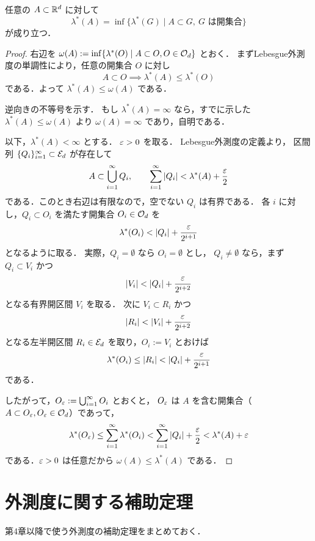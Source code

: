 \begin{theorem}[開集合による外正則性] \label{thm:lebesgue-outer-regularity-open}
任意の $A \subset \mathbb R^d$ に対して
\[
\lambda^*(A)
=
\inf\{\lambda^*(G)\mid A \subset G,\ G \text{ は開集合}\}
\]
が成り立つ．
\end{theorem}

\begin{proof}
    右辺を $\omega(A) := \inf\{ \lambda^*(O) \mid A \subset O, O \in \mathcal O_d \}$ とおく．
    まずLebesgue外測度の単調性により，任意の開集合 $O$ に対し \[A \subset O \implies \lambda^*(A) \le \lambda^*(O)\] である．よって $\lambda^*(A) \le \omega(A)$ である．

    逆向きの不等号を示す．
    もし $\lambda^*(A)=\infty$ なら，すでに示した $\lambda^*(A)\le\omega(A)$ より
    $\omega(A)=\infty$ であり，自明である．

    以下，$\lambda^*(A)<\infty$ とする．
    $\varepsilon>0$ を取る．
    Lebesgue外測度の定義より，
    区間列 $\{ Q_i \}_{i=1}^\infty \subset \mathcal E_d$ が存在して
    \[
    A \subset \bigcup_{i=1}^\infty Q_i,
    \qquad
    \sum_{i=1}^\infty |Q_i| < \lambda^*(A) + \frac{\varepsilon}{2}
    \]
    である．このとき右辺は有限なので，空でない $Q_i$ は有界である．
    各 $i$ に対し，$Q_i\subset O_i$ を満たす開集合 $O_i\in\mathcal O_d$ を
    \[
    \lambda^*(O_i) < |Q_i| + \frac{\varepsilon}{2^{i+1}}
    \]
    となるように取る．
    実際，$Q_i=\emptyset$ なら $O_i=\emptyset$ とし，
    $Q_i\neq\emptyset$ なら，まず $Q_i\subset V_i$ かつ
    \[
    |V_i|<|Q_i|+\frac{\eps}{2^{i+2}}
    \]
    となる有界開区間 $V_i$ を取る．
    次に $V_i\subset R_i$ かつ
    \[
    |R_i|<|V_i|+\frac{\eps}{2^{i+2}}
    \]
    となる左半開区間 $R_i\in\mathcal E_d$ を取り，$O_i:=V_i$ とおけば
    \[
    \lambda^*(O_i)\le |R_i|
    <
    |Q_i|+\frac{\varepsilon}{2^{i+1}}
    \]
    である．

    したがって，$O_\varepsilon := \bigcup_{i=1}^\infty O_i$ とおくと，
    $O_\varepsilon$ は $A$ を含む開集合（$A \subset O_\varepsilon, O_\varepsilon \in \mathcal O_d$）であって，
    \[
    \lambda^*(O_\varepsilon)
    \le
    \sum_{i=1}^\infty \lambda^*(O_i)
    <
    \sum_{i=1}^\infty |Q_i| + \frac{\varepsilon}{2}
    <
    \lambda^*(A) + \varepsilon
    \]
    である．$\varepsilon>0$ は任意だから $\omega(A) \le \lambda^*(A)$ である．
\end{proof}

\section{外測度に関する補助定理}

第4章以降で使う外測度の補助定理をまとめておく．

